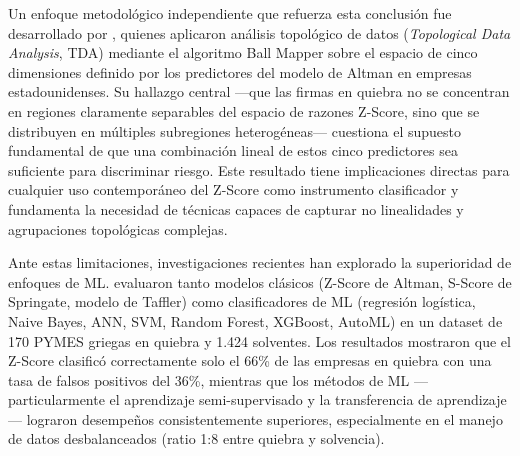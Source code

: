 \documentclass[12pt, letterpaper]{article}
\begin{document}
Un enfoque metodol\'ogico independiente que refuerza esta conclusi\'on fue desarrollado por \citet{Qiu2020}, quienes aplicaron an\'alisis topol\'ogico de datos (\textit{Topological Data Analysis}, TDA) mediante el algoritmo Ball Mapper sobre el espacio de cinco dimensiones definido por los predictores del modelo de Altman en empresas estadounidenses. Su hallazgo central ---que las firmas en quiebra no se concentran en regiones claramente separables del espacio de razones Z-Score, sino que se distribuyen en m\'ultiples subregiones heterog\'eneas--- cuestiona el supuesto fundamental de que una combinaci\'on lineal de estos cinco predictores sea suficiente para discriminar riesgo. Este resultado tiene implicaciones directas para cualquier uso contempor\'aneo del Z-Score como instrumento clasificador y fundamenta la necesidad de t\'ecnicas capaces de capturar no linealidades y agrupaciones topol\'ogicas complejas.

Ante estas limitaciones, investigaciones recientes han explorado la superioridad de enfoques de ML. \citet{Papadouli2024} evaluaron tanto modelos cl\'asicos (Z-Score de Altman, S-Score de Springate, modelo de Taffler) como clasificadores de ML (regresi\'on log\'istica, Naive Bayes, ANN, SVM, Random Forest, XGBoost, AutoML) en un dataset de 170 PYMES griegas en quiebra y 1.424 solventes. Los resultados mostraron que el Z-Score clasific\'o correctamente solo el 66\% de las empresas en quiebra con una tasa de falsos positivos del 36\%, mientras que los m\'etodos de ML ---particularmente el aprendizaje semi-supervisado y la transferencia de aprendizaje--- lograron desempe\~nos consistentemente superiores, especialmente en el manejo de datos desbalanceados (ratio 1:8 entre quiebra y solvencia).
\end{document}
